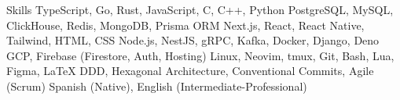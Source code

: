 
\begin{rubric}{Skills}
\entry*[Programming]
    TypeScript, Go, Rust, JavaScript, C, C++, Python
\entry*[Databases]
    PostgreSQL, MySQL, ClickHouse, Redis, MongoDB, Prisma ORM
    Next.js, React, React Native, Tailwind, \textsc{HTML, CSS}
    Node.js, NestJS, gRPC, Kafka, Docker, Django, Deno
\entry*[Cloud]
    GCP, Firebase (Firestore, Auth, Hosting)
    Linux, Neovim, tmux, Git, Bash, Lua, Figma, LaTeX
\entry*[Practices]
    DDD, Hexagonal Architecture, Conventional Commits, Agile (Scrum)
\entry*[Languages]
    Spanish (Native), English (Intermediate-Professional)
\end{rubric}
